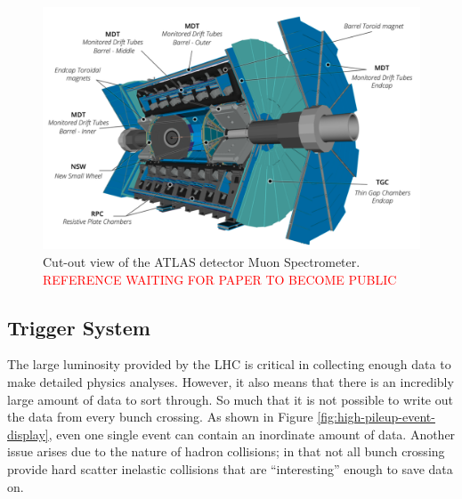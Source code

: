 		\begin{figure}[!ht]
		\centering
		\includegraphics[width=\textwidth,keepaspectratio=true]{chapters/chapter3_experiment/images/ATLAS_Muon_System_Run3.png}
		\caption{Cut-out view of the \gls{ATLAS} detector Muon Spectrometer. \textcolor{red}{REFERENCE WAITING FOR PAPER TO BECOME PUBLIC}}
		\label{fig:muon-spec}
		\end{figure}

	\subsection{Trigger System}\label{ssec:trigger}
		The large luminosity provided by the \gls{LHC} is critical in collecting enough data to make detailed physics analyses. However, it also means that there is an incredibly large amount of data to sort through. So much that it is not possible to write out the data from every bunch crossing. As shown in Figure \ref{fig:high-pileup-event-display}, even one single event can contain an inordinate amount of data. Another issue arises due to the nature of hadron collisions; in that not all bunch crossing provide hard scatter inelastic collisions that are ``interesting'' enough to save data on. 

